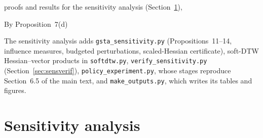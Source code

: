 
proofs and results for the sensitivity analysis (Section~\ref{sec:sens}), 

By Proposition~7(d)

 The sensitivity analysis adds \texttt{gsta\_sensitivity.py} (Propositions~11--14, influence measures, budgeted perturbations, scaled-Hessian certificate), soft-DTW Hessian--vector products in \texttt{softdtw.py}, \texttt{verify\_sensitivity.py} (Section~\ref{sec:sensverif}), \texttt{policy\_experiment.py}, whose stages reproduce Section~6.5 of the main text, and \texttt{make\_outputs.py}, which writes its tables and figures.

\section{Sensitivity analysis}\label{sec:sens}

